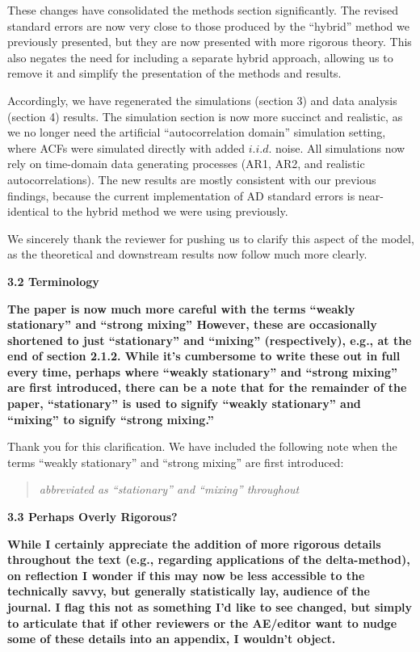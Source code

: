 \documentclass[docs/main.tex]{subfiles}
\newcommand{\reviewercomment}[1]{\vspace{0.3cm}\noindent\textbf{#1}\vspace{0.15cm}}
\newcommand{\manuscriptquote}[1]{\begin{quote}\textit{#1}\end{quote}}
\begin{document}
These changes have consolidated the methods section significantly. The revised standard errors are now very close to those produced by the ``hybrid'' method we previously presented, but they are now presented with more rigorous theory. This also negates the need for including a separate hybrid approach, allowing us to remove it and simplify the presentation of the methods and results.

Accordingly, we have regenerated the simulations (section 3) and data analysis (section 4) results. The simulation section is now more succinct and realistic, as we no longer need the artificial ``autocorrelation domain'' simulation setting, where ACFs were simulated directly with added $i.i.d.$ noise. All simulations now rely on time-domain data generating processes (AR1, AR2, and realistic autocorrelations). The new results are mostly consistent with our previous findings, because the current implementation of AD standard errors is near-identical to the hybrid method we were using previously. 

We sincerely thank the reviewer for pushing us to clarify this aspect of the model, as the theoretical and downstream results now follow much more clearly.


\textbf{3.2 Terminology}

\reviewercomment{The paper is now much more careful with the terms ``weakly stationary'' and ``strong mixing'' However, these are occasionally shortened to just ``stationary'' and ``mixing'' (respectively), e.g., at the end of section 2.1.2. While it's cumbersome to write these out in full every time, perhaps where ``weakly stationary'' and ``strong mixing'' are first introduced, there can be a note that for the remainder of the paper, ``stationary'' is used to signify ``weakly stationary'' and ``mixing'' to signify ``strong mixing.''}

Thank you for this clarification. We have included the following note when the terms ``weakly stationary'' and ``strong mixing'' are first introduced:

\manuscriptquote{abbreviated as ``stationary'' and ``mixing'' throughout}

\textbf{3.3 Perhaps Overly Rigorous?}

\reviewercomment{While I certainly appreciate the addition of more rigorous details throughout the text (e.g., regarding applications of the delta-method), on reflection I wonder if this may now be less accessible to the technically savvy, but generally statistically lay, audience of the journal. I flag this not as something I'd like to see changed, but simply to articulate that if other reviewers or the AE/editor want to nudge some of these details into an appendix, I wouldn't object.}
\end{document}
